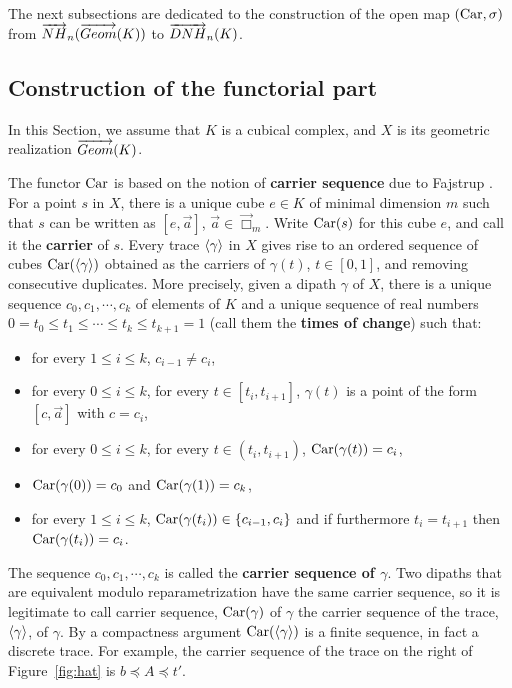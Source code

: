 The next subsections are dedicated to the construction of the open map $(\text{Car},\sigma)$ from $\overrightarrow{NH}_{n}(\overrightarrow{Geom}(K))$ to $\overrightarrow{DNH}_{n}(K)$.


\subsection{Construction of the functorial part}
\label{subsec:funpar}

In this Section, we assume that $K$ is a cubical complex, and $X$ is
its geometric realization $\overrightarrow{Geom}(K)$.

  The functor $\text{Car}$ is based on the notion of \textbf{carrier sequence} due to
  Fajstrup \cite{fajstrup05}.  For a point $s$ in $X$, there is a
  unique cube $e \in K$ of minimal dimension $m$ such that $s$ can be
  written as $[e, \vec a]$, $\vec a \in \overrightarrow \Box_m$.  Write
  $\text{Car} (s)$ for this cube $e$, and call it the \textbf{carrier}
  of $s$.  Every trace $\langle\gamma\rangle$ in $X$ gives rise to an
  ordered sequence of cubes $\text{Car}(\langle\gamma\rangle)$
  obtained as the carriers of $\gamma (t)$, $t \in [0, 1]$, and removing
  consecutive duplicates.  More precisely, given a dipath $\gamma$ of $X$, there is
a unique sequence $c_0,c_1,\cdots,c_k$ of elements of $K$ and a unique
sequence of real numbers $0=t_0\leq t_1\leq\cdots\leq t_k \leq
t_{k+1}=1$ (call them the \textbf{times of change}) such that:
\begin{itemize}
\item for every $1\leq i \leq k$, $c_{i-1} \neq c_i$,
\item for every $0\leq i\leq k$, for every $t \in [t_i,t_{i+1}]$, $\gamma
  (t)$ is a point of the form $[c, \vec a]$ with $c=c_i$,
\item for every $0\leq i \leq k$, for every $t\in (t_i,t_{i+1})$,
  $\text{Car}(\gamma(t)) = c_i$,
\item $\text{Car}(\gamma(0)) = c_0$ and $\text{Car}(\gamma(1)) = c_k$,
\item for every $1\leq i \leq k$, $\text{Car}(\gamma(t_i)) \in
  \{c_{i-1},c_i\}$ and if furthermore $t_i = t_{i+1}$ then
  $\text{Car}(\gamma(t_i)) = c_i$.
\end{itemize}
The sequence $c_0,c_1,\cdots,c_k$ is called the \textbf{carrier sequence of
  $\gamma$}.  Two dipaths that are equivalent modulo reparametrization
have the same carrier sequence, so it is legitimate to call carrier
sequence, $\text{Car}(\gamma)$ of $\gamma$ the carrier sequence of the trace, $\langle\gamma\rangle$, of $\gamma$. By a compactness argument $\text{Car}(\langle\gamma\rangle)$ is a finite
  sequence, in fact a discrete trace. For example, the carrier
  sequence of the trace on the right of Figure~\ref{fig:hat} is $b
  \preceq A \preceq t'$.
  
